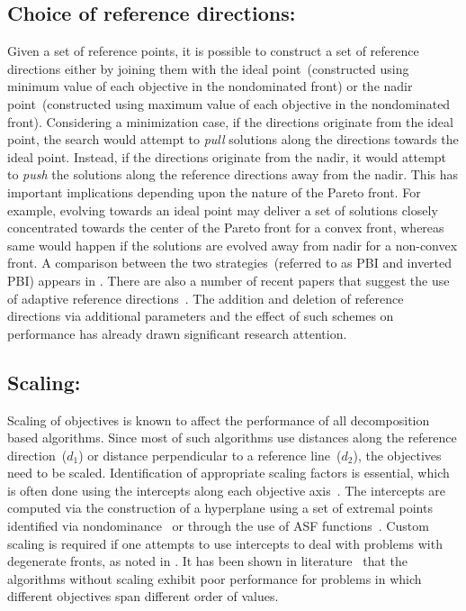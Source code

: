 \subsection{Choice of reference directions:} Given a set of reference points, it is possible to construct a set of reference directions either by joining them with the ideal point~(constructed using minimum value of each objective in the nondominated front) or the nadir point~(constructed using maximum value of each objective in the nondominated front). Considering a minimization case, if the directions originate from the ideal point, the search would attempt to \textit{pull} solutions along the directions towards the ideal point. Instead, if the directions originate from the nadir, it would attempt to \textit{push} the solutions along the reference directions away from the nadir. This has important implications depending upon the nature of the Pareto front. For example, evolving towards an ideal point may deliver a set of solutions closely concentrated towards the center of the Pareto front for a convex front, whereas same would happen if the solutions are evolved away from nadir for a non-convex front. A comparison between the two strategies~(referred to as PBI and inverted PBI) appears in \cite{sato2014inverted}. There are also a number of recent papers that suggest the use of adaptive reference directions~\cite{ishibuchi2009adaptation, Qi2014adaptive, Wang2016adaptive, Cheng2016many, Deb2014adaptive,cheng2015adaptive}. The addition and deletion of reference directions via additional parameters and the effect of such schemes on performance has already drawn significant research attention.

\subsection{Scaling:} Scaling of objectives is known to affect the performance of all decomposition based algorithms. Since most of such algorithms use distances along the reference direction~($d_1$) or distance perpendicular to a reference line~($d_2$), the objectives need to be scaled. Identification of appropriate scaling factors is essential, which is often done using the intercepts along each objective axis~\cite{Deb2014box,Asafmany2015,Yuan2016many}. The intercepts are computed via the construction of a hyperplane using a set of extremal points identified via nondominance~\cite{Deb2014box,Asafmany2015} or through the use of ASF functions~\cite{Yuan2016many,miettinen2012nonlinear}. Custom scaling is required if one attempts to use intercepts to deal with problems with degenerate fronts, as noted in \cite{Deb2014box}. It has been shown in literature~\cite{Deb2014box} that the algorithms without scaling exhibit poor performance for problems in which different objectives span different order of values. 

